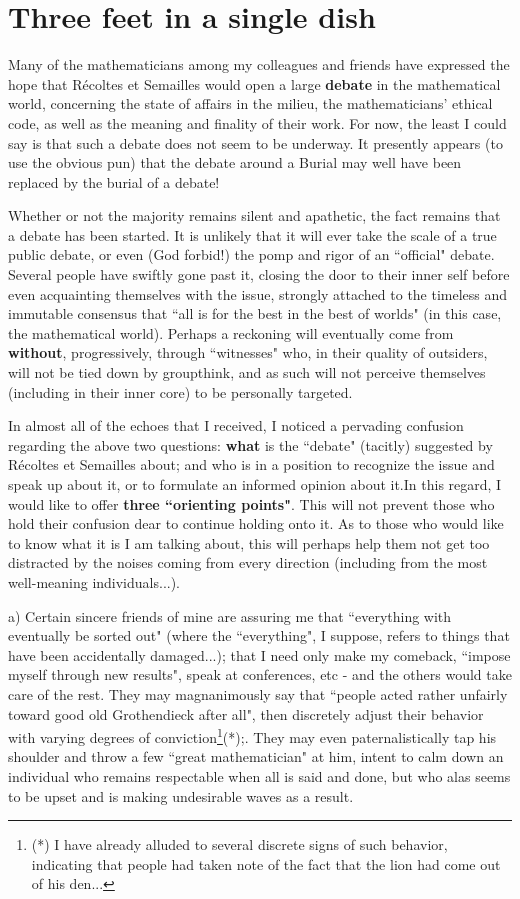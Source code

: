 \section{Three feet in a single dish}

Many of the mathematicians among my colleagues and friends have expressed the hope that R\'ecoltes et Semailles would open a large \textbf{debate} in the mathematical world, concerning the state of affairs in the milieu, the mathematicians' ethical code, as well as the meaning and finality of their work. For now, the least I could say is that such a debate does not seem to be underway. It presently appears (to use the obvious pun) that the debate around a Burial may well have been replaced by the burial of a debate!

Whether or not the majority remains silent and apathetic, the fact remains that a debate has been started. It is unlikely that it will ever take the scale of a true public debate, or even (God forbid!) the pomp and rigor of an ``official" debate. Several people have swiftly gone past it, closing the door to their inner self before even acquainting themselves with the issue, strongly attached to the timeless and immutable consensus that ``all is for the best in the best of worlds" (in this case, the mathematical world). Perhaps a reckoning will eventually come from \textbf{without}, progressively, through ``witnesses" who, in their quality of outsiders, will not be tied down by groupthink, and as such will not perceive themselves (including in their inner core) to be personally targeted.

In almost all of the echoes that I received, I noticed a pervading confusion regarding the above two questions: \textbf{what} is the ``debate" (tacitly) suggested by R\'ecoltes et Semailles about; and who is in a position to recognize the issue and speak up about it, or to formulate an informed opinion about it.In this regard, I would like to offer \textbf{three ``orienting points"}. This will not prevent those who hold their confusion dear to continue holding onto it. As to those who would like to know what it is I am talking about, this will perhaps help them not get too distracted by the noises coming from every direction (including from the most well-meaning individuals...).

a) Certain sincere friends of mine are assuring me that ``everything with eventually be sorted out" (where the ``everything", I suppose, refers to things that have been accidentally damaged...); that I need only make my comeback, ``impose myself through new results", speak at conferences, etc - and the others would take care of the rest. They may magnanimously say that ``people acted rather unfairly toward good old Grothendieck after all", then discretely adjust their behavior with varying degrees of conviction\footnote{(*) I have already alluded to several discrete signs of such behavior, indicating that people had taken note of the fact that the lion had come out of his den...}(*);. They may even paternalistically tap his shoulder and throw a few ``great mathematician" at him, intent to calm down an individual who remains respectable when all is said and done, but who alas seems to be upset and is making undesirable waves as a result.  

